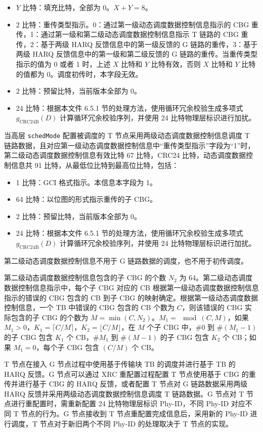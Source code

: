 \documentclass[11pt,a4paper]{ctexart}
\begin{document}
\begin{itemize}[nosep]
  \item $Y$ 比特：填充比特，全部为 0。$X+Y=8$。
  \item 2 比特：重传类型指示。0：通过第一级动态调度数据控制信息指示的 CBG 重传，1：通过第一级和第二级动态调度数据控制信息指示 T 链路的 CBG 重传，2：基于两级 HARQ 反馈信息中的第一级反馈的 G 链路的重传，3：基于两级 HARQ 反馈信息中的第一级和第二级反馈的 G 链路的重传。当重传类型指示的值为 0 或者 1 时，上述 $X$ 比特和 $Y$ 比特有效，否则 $X$ 比特和 $Y$ 比特的值都为 0。调度初传时，本字段无效。
  \item 2 比特：预留比特，当前版本全部为 0。
  \item 24 比特：根据本文件 6.5.1 节的处理方法，使用循环冗余校验生成多项式 $g_{\mathrm{CRC24B}}(D)$ 计算循环冗余校验序列，并使用 24 比特物理层标识进行加扰。
\end{itemize}

当高层 \texttt{schedMode} 配置被调度的 T 节点采用两级动态调度数据控制信息调度 T 链路数据，且对应第一级动态调度数据控制信息中``重传类型指示''字段为``1''时，第二级动态调度数据控制信息有效比特 67 比特，CRC24 比特，动态调度数据控制信息共 91 比特，从最低位比特到最高位比特，包括：
\begin{itemize}[nosep]
  \item 1 比特：GCI 格式指示。本信息本字段为 1。
  \item 64 比特：以位图的形式指示重传的子 CBG。
  \item 2 比特：预留比特，当前版本全部为 0。
  \item 24 比特：根据本文件 6.5.1 节的处理方法，使用循环冗余校验生成多项式 $g_{\mathrm{CRC24B}}(D)$ 计算循环冗余校验序列，并使用 24 比特物理层标识进行加扰。
\end{itemize}

第二级动态调度数据控制信息不用于 G 链路数据的调度，也不用于初传调度。

第二级动态调度数据控制信息包含的子 CBG 的个数 $N_2$ 为 64。第二级动态调度数据控制信息指示中，每个子 CBG 对应的 CB 根据第一级动态调度数据控制信息指示的错误的 CBG 包含的 CB 到子 CBG 的映射确定。根据第一级动态调度数据控制信息，一个 TB 中错误的 CBG 包含的 CB 个数为 $C$，则该错误的 CBG 实际包含的子 CBG 的个数为 $M = \min(C, N_2)$。$M_1 = \mod(C, M)$，如果 $M_1 > 0$，$K_1 = \lceil C/M \rceil$，$K_2 = \lfloor C/M \rfloor$，在 $M$ 个子 CBG 中，\#0 到 \#$(M_1-1)$ 的子 CBG 包含 $K_1$ 个 CB，\#$M_1$ 到 \#$(M-1)$ 的子 CBG 包含 $K_2$ 个 CB；如果 $M_1 = 0$，每个子 CBG 包含 $(C/M)$ 个 CB。

T 节点在接入 G 节点过程中使用基于传输块 TB 的调度并进行基于 TB 的 HARQ 反馈。G 节点可以通过 XRC 重配置过程配置 T 节点使用基于 CBG 的重传并进行基于 CBG 的 HARQ 反馈，或者配置 T 节点对 G 链路数据采用两级 HARQ 反馈并采用两级动态调度数据控制信息调度 T 链路数据。G 节点对 T 节点进行重配置时，需重新配置 24 比特物理层标识 Phy-ID，不同 Phy-ID 对应不同 T 节点的行为。G 节点接收到 T 节点重配置完成信息后，采用新的 Phy-ID 进行调度，T 节点对于新旧两个不同 Phy-ID 的处理取决于 T 节点的实现。
\end{document}
